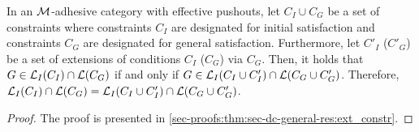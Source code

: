 \begin{theorem}
\label{thm:sec-dc-general-res:ext_constr}
In an ${\cal M}$-adhesive category with effective pushouts, let $C_I \cup C_G$ be a set of constraints where constraints $C_I$ are designated for initial satisfaction and constraints $C_G$ are designated for general satisfaction.
Furthermore, let $C'_I$ ($C'_G$) be a set of extensions of conditions $C_I$ ($C_G$) via $C_G$.
Then, it holds that $G \in \mathcal{L}_I(C_I) \cap \mathcal{L}(C_G)$ if and only if $G \in \mathcal{L}_I(C_I \cup C'_I) \cap \mathcal{L}(C_G \cup C'_G)$.
Therefore, $\mathcal{L}_I(C_I) \cap \mathcal{L}(C_G)=\mathcal{L}_I(C_I \cup C'_I) \cap \mathcal{L}(C_G \cup C'_G)$.
\envEndMarker
\end{theorem}

\begin{proof}
The proof is presented in \cref{sec-proofs:thm:sec-dc-general-res:ext_constr}.
\end{proof}
